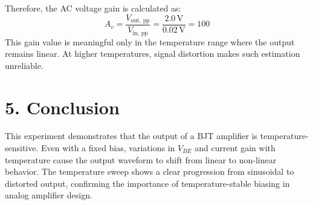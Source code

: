 \documentclass[12pt,a4paper]{article}
\begin{document}
\vspace{1ex}
Therefore, the AC voltage gain is calculated as:
\[
A_v = \frac{V_{\text{out, pp}}}{V_{\text{in, pp}}} = \frac{2.0\,\mathrm{V}}{0.02\,\mathrm{V}} = 100
\]
This gain value is meaningful only in the temperature range where the output remains linear. At higher temperatures, signal distortion makes such estimation unreliable.

\section*{5. Conclusion}
This experiment demonstrates that the output of a BJT amplifier is temperature-sensitive. Even with a fixed bias, variations in $V_{BE}$ and current gain with temperature cause the output waveform to shift from linear to non-linear behavior. The temperature sweep shows a clear progression from sinusoidal to distorted output, confirming the importance of temperature-stable biasing in analog amplifier design.
\end{document}
